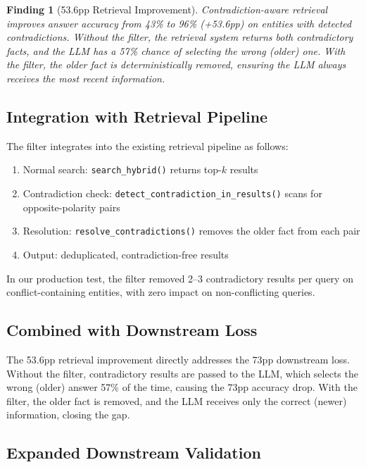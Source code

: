 \documentclass{article}
\newtheorem{finding}{Finding}
\begin{document}
\begin{finding}[53.6pp Retrieval Improvement]
Contradiction-aware retrieval improves answer accuracy from 43\% to 96\% (+53.6pp) on entities with detected contradictions. Without the filter, the retrieval system returns both contradictory facts, and the LLM has a 57\% chance of selecting the wrong (older) one. With the filter, the older fact is deterministically removed, ensuring the LLM always receives the most recent information.
\end{finding}

\subsection{Integration with Retrieval Pipeline}

The filter integrates into the existing retrieval pipeline as follows:

\begin{enumerate}
\item Normal search: \texttt{search\_hybrid()} returns top-$k$ results
\item Contradiction check: \texttt{detect\_contradiction\_in\_results()} scans for opposite-polarity pairs
\item Resolution: \texttt{resolve\_contradictions()} removes the older fact from each pair
\item Output: deduplicated, contradiction-free results
\end{enumerate}

In our production test, the filter removed 2--3 contradictory results per query on conflict-containing entities, with zero impact on non-conflicting queries.

\subsection{Combined with Downstream Loss}

The 53.6pp retrieval improvement directly addresses the 73pp downstream loss. Without the filter, contradictory results are passed to the LLM, which selects the wrong (older) answer 57\% of the time, causing the 73pp accuracy drop. With the filter, the older fact is removed, and the LLM receives only the correct (newer) information, closing the gap.


\subsection{Expanded Downstream Validation}
\label{sec:expanded}
\end{document}
